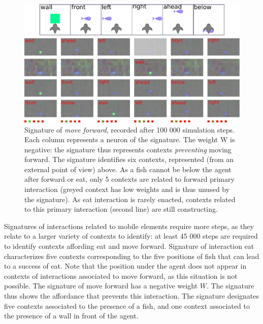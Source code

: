 \documentclass[conference]{IEEEtran}
\begin{document}
\begin{figure}[ht]
\centerline{\includegraphics[scale=0.32]{img/sig_forward.pdf}}
\caption{Signature of \textit{move forward}, recorded after 100 000 simulation steps. Each column represents a neuron of the signature. The weight W is negative: the signature thus represents contexts \textit{preventing} moving forward. The signature identifies six contexts, represented (from an external point of view) above. As a fish cannot be below the agent after forward or eat, only 5 contexts are related to forward primary interaction (greyed context has low weights and is thus unused by the signature). As eat interaction is rarely enacted, contexts related to this primary interaction (second line) are still constructing. %
}
\label{fig}
\end{figure}


Signatures of interactions related to mobile elements require more steps, as they relate to a larger variety of contexts to identify: at least 45 000 steps are required to identify contexts affording eat and move forward. Signature of interaction eat characterizes five contexts corresponding to the five positions of fish that can lead to a success of eat. Note that the position under the agent does not appear in contexts of interactions associated to move forward, as this situation is not possible. The signature of move forward has a negative weight $W$. The signature thus shows the affordance that prevents this interaction. The signature designates five contexts associated to the presence of a fish, and one context associated to the presence of a wall in front of the agent.

\end{document}
